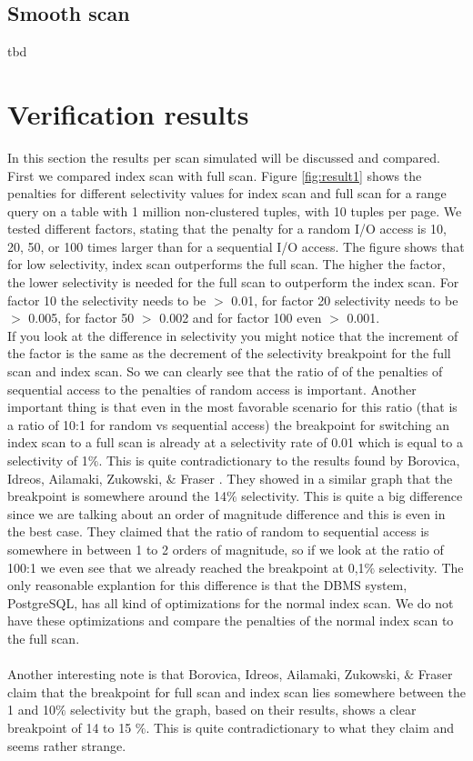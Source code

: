 \documentclass[a4paper,11pt,twoside]{article}
\begin{document}
\subsection{Smooth scan}
tbd


\section{Verification results}
In this section the results per scan simulated will be discussed and compared.  First we compared index scan with full scan. Figure \ref{fig:result1} shows the penalties for different selectivity values for index scan and full scan for a range query on a table with 1 million non-clustered tuples, with 10 tuples per page. We tested different factors, stating that the penalty for a random I/O access is 10, 20,  50, or 100 times larger than for a sequential I/O access. The figure shows that for low selectivity, index scan outperforms the full scan. The higher the factor, the lower selectivity is needed for the full scan to outperform the index scan. For factor 10 the selectivity needs to be $>$ 0.01, for factor 20 selectivity needs to be $>$ 0.005, for factor 50 $>$ 0.002 and for factor 100 even $>$ 0.001.\\
If you look at the difference in selectivity you might notice that the increment of the factor is the same as the decrement of the selectivity breakpoint for the full scan and index scan. So we can clearly see that the ratio of of the penalties of sequential access to the penalties of random access is important. Another important thing is that even in the most favorable scenario for this ratio (that is a ratio of 10:1 for random vs sequential access) the breakpoint for switching an index scan to a full scan is already at a selectivity rate of 0.01 which is equal to a selectivity of 1$\%$. This is quite contradictionary to the results found by Borovica, Idreos, Ailamaki, Zukowski, $\&$ Fraser \cite{smoothscan}. They showed in a similar graph that the breakpoint is somewhere around the 14$\%$ selectivity. This is quite a big difference since we are talking about an order of magnitude difference and this is even in the best case. They claimed that the ratio of random to sequential access is somewhere in between 1 to 2 orders of magnitude, so if we look at the ratio of 100:1 we even see that we already reached the breakpoint at 0,1$\%$ selectivity. The only reasonable explantion for this difference is that the DBMS system, PostgreSQL, has all kind of optimizations for the normal index scan. We do not have these optimizations and compare the penalties of the normal index scan to the full scan. \\
\\
Another interesting note is that Borovica, Idreos, Ailamaki, Zukowski, $\&$ Fraser \cite{smoothscan} claim that the breakpoint for full scan and index scan lies somewhere between the 1 and 10$\%$ selectivity but the graph, based on their results, shows a clear breakpoint of 14 to 15 $\%$. This is quite contradictionary to what they claim and seems rather strange.
\end{document}
